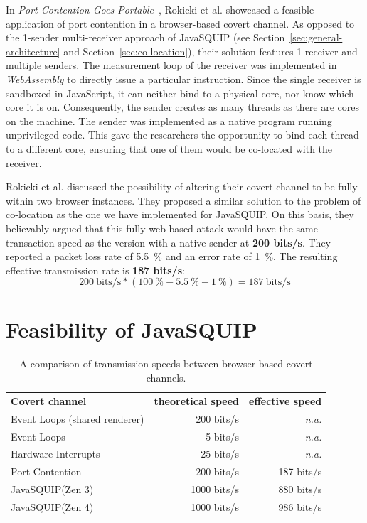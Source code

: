 \documentclass[11pt,
  titlepage=false,
  parskip=half,      %
]{scrreprt}
\begin{document}
In \textit{Port Contention Goes Portable}~\cite{Rokicki2022webport},
Rokicki et al. showcased a feasible application of port contention in a browser-based covert channel.
As opposed to the 1-sender multi-receiver approach of JavaSQUIP (see Section~\ref{sec:general-architecture} and Section~\ref{sec:co-location}),
their solution features 1 receiver and multiple senders.
The measurement loop of the receiver was implemented in \textit{WebAssembly} to directly issue a particular instruction.
Since the single receiver is sandboxed in JavaScript, it can neither bind to a physical core, nor know which core it is on.
Consequently, the sender creates as many threads as there are cores on the machine.
The sender was implemented as a native program running unprivileged code.
This gave the researchers the opportunity to bind each thread to a different core,
ensuring that one of them would be co-located with the receiver.

Rokicki et al. discussed the possibility of altering their covert channel to be fully within two browser instances.
They proposed a similar solution to the problem of co-location as the one we have implemented for JavaSQUIP.
On this basis, they believably argued that this fully web-based attack would have the same transaction speed as the version
with a native sender at \textbf{200 bits/s}.
They reported a packet loss rate of 5.5~\% and an error rate of 1~\%.
The resulting effective transmission rate is \textbf{187 bits/s}:
\[200~\text{bits/s} * (100~\% - 5.5~\% - 1~\%) = 187~\text{bits/s}\]

\section{Feasibility of JavaSQUIP}


\begin{table}[t]
\centering
\begin{tabular}{ |l|r|r| }
\hline
\textbf{Covert channel} & \textbf{theoretical speed} & \textbf{effective speed} \\
\Xhline{2pt}
Event Loops (shared renderer) & 200 bits/s & \textit{n.a.} \\
\hline
Event Loops & 5 bits/s & \textit{n.a.} \\
\hline
Hardware Interrupts & 25 bits/s & \textit{n.a.} \\
\hline
Port Contention & 200 bits/s & 187 bits/s \\
\hline
JavaSQUIP(Zen 3) & 1000 bits/s & 880 bits/s\\
\hline
JavaSQUIP(Zen 4) & 1000 bits/s & 986 bits/s\\
\hline
\end{tabular}

\caption{A comparison of transmission speeds between browser-based covert channels.}
\label{tab:speedcomparison}
\end{table}
\end{document}
